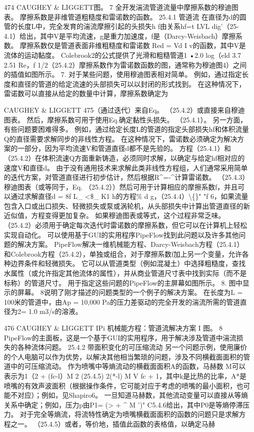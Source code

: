 \documentclass[UTF8,11pt,a4paper,openany,fontset=fandol]{ctexbook}
\begin{document}
474 CAUGHEY \& LIGGETT图。 7 全开发湍流管道流量中摩擦系数的穆迪图表。 摩擦系数是非维管道粗糙度和雷诺数的函数。 25.4.1 管道流 在直径为d的圆管的长度L中，完全发育的湍流摩擦引起的头损失h f由关系hf=t LVL dig'（25-4.1）给出，其中V是平均流速，g是重力加速度，f是（Darcy-Weisbach）摩擦系数。 摩擦系数仅是管道表面非维粗糙度和雷诺数 Red = Vd I v的函数，其中V是流体的运动黏度。 Colebrook2的公式提供了光滑和粗糙管道1 •2.0 log（eld 3.7 2.51 Re，f 1/2（25.4.2）摩擦系数作为雷诺数函数的图，通常称为穆迪图4）之间的插值如图所示。 7. 对于某些问题，使用穆迪图表相对简单。 例如，通过指定长度和直径的管道的给定流速的头部损失可以以封闭的形式找到。 在这种情况下，雷诺数可以直接从给定的数量中计算，摩擦系数确定为

CAUGHEY \& LIGGETT 475（通过迭代）来自Eq。 （25.4.2）或直接来自穆迪图表。 然后，摩擦系数可用于使用Eq.确定黏性头损失。 （25.4.1）。 另一方面，有些问题要困难得多。 例如，通过给定长度L的管道的指定头部损失hf和体积流量Q的直径需要求解同步的非线性方程。 在这种情况下，雷诺数必须确定为解决方案的一部分，因为平均流速V和管道直径d都不是先验的。 方程（25.4.1）和（25.4.2）在体积流速Q方面重新铸造，必须同时求解，以确定与给定hf相对应的速度V和直径d。 由于没有通用技术来求解此类非线性方程组，人们通常采用简单的迭代方案，对管道直径进行初步估计，然后根据R\textasciicircum{}=-\textasciicircum{}计算雷诺数。 （25.4.3）穆迪图表（或等同于，Eq. （25.4.2））然后可用于计算相应的摩擦系数f，并且可以通过求解直径d = 8f L\_ <\$\_ K1 h的方程\% d g，（25.4.4）\textbackslash\{\}" "f 6，如果流量包含入口或出口损失、轻微损失或泵或涡轮机，从头部损失中计算出管道直径的新近似值，方程变得更加复杂。 如果穆迪图表或等式，这个过程非常乏味。 （25.4.2）必须用于确定每次迭代时雷诺数的摩擦系数，但它可以在计算机上轻松实现自动化。 可以使用基于GUI的实用程序PipeFlow找到此问题以及许多其他问题的解决方案。 PipeFlow解决一维机械能方程、Darcy-Weisbach方程（25.4.1）和Colebrook方程（25.4.2），单独或组合，对于摩擦系数f加上另一个变量，允许各种边界条件和轻微损失。 它可以从管道类型（例如混凝土）中选择粗糙度，查找水属性（或允许指定其他流体的属性），并从商业管道尺寸表中找到实际（而不是标称）的管道尺寸。 用于指定这些问题的PipeFlow的主屏幕如图所示。 8. 图中显示的屏幕。 8说明了刚才描述的问题类型的一个例子的解决方案。 在长度为L = 100米的管道中，由Ap = 10,000 Pa的压力差驱动的完全开发的湍流所需的管道直径为2= 1.0 m3/s的溶液。

476 CAUGHEY \& LIGGETT IPi 机械能方程：管道流解决方案 I 图。 8 PipeFlow的主面板，这是一个基于GUI的实用程序，用于解决涉及管道中湍流损失的各种流体问题。 25.4.2 带面积变化的可压缩流动 另一个问题示例，使用廉价的个人电脑可以作为优势，以解决其他相当繁琐的问题，涉及不同横截面面积的管道中的可压缩流动。 作为喷嘴中等熵流动的横截面面积A的函数，马赫数 M可以表示为1（2 + (fc-l）M 2 (25.4.5) 2(*-l) M V fc + 1，其中k是比热的比率，A*是喷嘴的有效声波面积（根据操作条件，它可能对应于考虑的喷嘴的最小面积，也可能不对应）；例如，见Shapiro6。 一旦知道马赫数，其他流动变量可以直接从等熵关系中确定；例如，压力p由P1= (> + \textasciicircum{} M ')" C5.4.6给出，其中P0是等熵停滞压力。 对于完全等熵流，将流特性确定为喷嘴横截面面积的函数的问题只是求解方程之一。 （25.4.5）或者，等价地，插值此函数的表格值，以确定马赫
\end{document}
